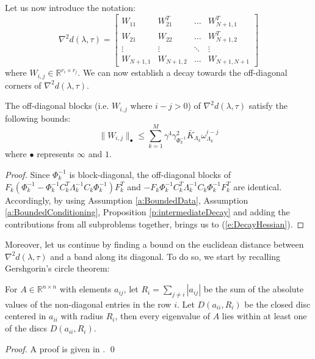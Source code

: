 Let us now introduce the notation:
\begin{equation}
\nabla^2 d(\lambda, \tau) = \left[ \begin{array}{cccc}
W_{11} & W_{21}^T & \hdots & W_{N+1,1}^T \\
W_{21} & W_{22} & \hdots & W_{N+1,2}^T \\
\vdots & \vdots  & \ddots & \vdots \\
W_{N+1,1} & W_{N+1,2} & \hdots & W_{N+1,N+1}
\end{array} \right]
\end{equation}
where $W_{i,j} \in \mathbb{R}^{r_i \times r_j}$. We can now establish a decay towards the off-diagonal corners of $\nabla^2 d(\lambda, \tau)$.

\begin{proposition} \label{p:DecayHessian}
The off-diagonal blocks (i.e. $W_{i,j}$ where $i - j > 0$) of $\nabla^2 d(\lambda, \tau)$ satisfy the following bounds:
\begin{equation}
\label{e:DecayHessian}
\| W_{i,j} \|_\bullet \leq \sum_{k=1}^M \gamma^4 \gamma_{\Phi_k^{-1}}^2 \bar{K}_{\Lambda_k} \omega_{\Lambda_k}^{i-j} 
\end{equation}
where $\bullet$ represents $\infty$ and $1$.
\end{proposition}
\begin{proof}
Since $\Phi_k^{-1}$ is block-diagonal, the off-diagonal blocks of $F_k (\Phi_k^{-1} - \Phi_k^{-1} C_k^T \Lambda_k^{-1} C_k \Phi_k^{-1}) F_k^T$ and $-F_k \Phi_k^{-1} C_k^T \Lambda_k^{-1} C_k \Phi_k^{-1} F_k^T$ are identical. Accordingly, by using Assumption \ref{a:BoundedData}, Assumption \ref{a:BoundedConditioning}, Proposition \ref{p:intermediateDecay} and adding the contributions from all subproblems together, brings us to (\ref{e:DecayHessian}).
\end{proof}

Moreover, let us continue by finding a bound on the euclidean distance between $\nabla^2 d(\lambda, \tau)$ and a band along its diagonal. To do so, we start by recalling Gershgorin's circle theorem:
\begin{theorem} \label{l:Gerschgorin}
For $A \in \mathbb{R}^{n \times n}$ with elements $a_{ij}$, let $R_i = \sum_{j \neq i} | a_{ij} |$ be the sum of the absolute values of the non-diagonal entries in the row $i$. Let $D(a_{ii},R_i)$ be the closed disc centered in $a_{ii}$ with radius $R_i$, then every eigenvalue of $A$ lies within at least one of the discs $D(a_{ii}, R_i)$.
\end{theorem}
\begin{proof}
A proof is given in \cite{}.
\qed
\end{proof}

